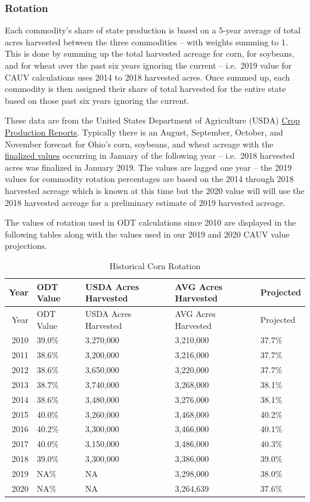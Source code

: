 \documentclass[]{article}
\begin{document}
\hypertarget{rotation}{%
\subsubsection{Rotation}\label{rotation}}

Each commodity's share of state production is based on a 5-year average
of total acres harvested between the three commodities -- with weights
summing to 1. This is done by summing up the total harvested acreage for
corn, for soybeans, and for wheat over the past six years ignoring the
current -- i.e.~2019 value for CAUV calculations uses 2014 to 2018
harvested acres. Once summed up, each commodity is then assigned their
share of total harvested for the entire state based on those past six
years ignoring the current.

These data are from the United States Department of Agriculture (USDA)
\href{https://usda.mannlib.cornell.edu/MannUsda/viewDocumentInfo.do?documentID=1046}{Crop
Production Reports}. Typically there is an August, September, October,
and November forecast for Ohio's corn, soybeans, and wheat acreage with
the
\href{https://usda.mannlib.cornell.edu/MannUsda/viewDocumentInfo.do?documentID=1047}{finalized
values} occurring in January of the following year -- i.e.~2018
harvested acres was finalized in January 2019. The values are lagged one
year -- the 2019 values for commodity rotation percentages are based on
the 2014 through 2018 harvested acreage which is known at this time but
the 2020 value will will use the 2018 harvested acreage for a
preliminary estimate of 2019 harvested acreage.

The values of rotation used in ODT calculations since 2010 are displayed
in the following tables along with the values used in our 2019 and 2020
CAUV value projections.

\begin{longtable}[]{@{}rllll@{}}
\caption{Historical Corn Rotation}\tabularnewline
\toprule
Year & ODT Value & USDA Acres Harvested & AVG Acres Harvested &
Projected\tabularnewline
\midrule
\endfirsthead
\toprule
Year & ODT Value & USDA Acres Harvested & AVG Acres Harvested &
Projected\tabularnewline
\midrule
\endhead
2010 & 39.0\% & 3,270,000 & 3,210,000 & 37.7\%\tabularnewline
2011 & 38.6\% & 3,200,000 & 3,216,000 & 37.7\%\tabularnewline
2012 & 38.6\% & 3,650,000 & 3,220,000 & 37.7\%\tabularnewline
2013 & 38.7\% & 3,740,000 & 3,268,000 & 38.1\%\tabularnewline
2014 & 38.6\% & 3,480,000 & 3,276,000 & 38.1\%\tabularnewline
2015 & 40.0\% & 3,260,000 & 3,468,000 & 40.2\%\tabularnewline
2016 & 40.2\% & 3,300,000 & 3,466,000 & 40.1\%\tabularnewline
2017 & 40.0\% & 3,150,000 & 3,486,000 & 40.3\%\tabularnewline
2018 & 39.0\% & 3,300,000 & 3,386,000 & 39.0\%\tabularnewline
2019 & NA\% & NA & 3,298,000 & 38.0\%\tabularnewline
2020 & NA\% & NA & 3,264,639 & 37.6\%\tabularnewline
\bottomrule
\end{longtable}
\end{document}
